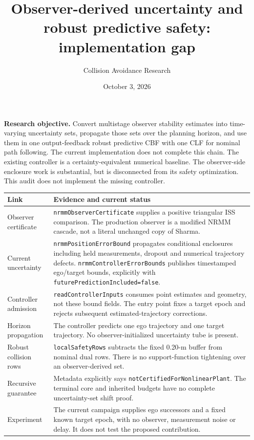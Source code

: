 \documentclass[10pt]{article}
\title{Observer-derived uncertainty and robust predictive safety: implementation gap}
\author{Collision Avoidance Research}
\date{October 3, 2026}
\begin{document}
\maketitle
\textbf{Research objective.} Convert multistage observer stability estimates into
time-varying uncertainty sets, propagate those sets over the planning horizon,
and use them in one output-feedback robust predictive CBF with one CLF for
nominal path following. The current implementation does not complete this chain.
The existing controller is a certainty-equivalent numerical baseline. The
observer-side enclosure work is substantial, but is disconnected from its safety
optimization. This audit does not implement the missing controller.

\begin{tabularx}{\textwidth}{@{}l>{\raggedright\arraybackslash}X@{}}
\toprule
Link & Evidence and current status \\
\midrule
Observer certificate & \texttt{nrmmObserverCertificate} supplies a positive triangular ISS comparison. The production observer is a modified NRMM cascade, not a literal unchanged copy of Sharma. \\
Current uncertainty & \texttt{nrmmPositionErrorBound} propagates conditional enclosures including held measurements, dropout and numerical trajectory defects. \texttt{nrmmControllerErrorBounds} publishes timestamped ego/target bounds, explicitly with \texttt{futurePredictionIncluded=false}. \\
Controller admission & \texttt{readControllerInputs} consumes point estimates and geometry, not these bound fields. The entry point fixes a target epoch and rejects subsequent estimated-trajectory corrections. \\
Horizon propagation & The controller predicts one ego trajectory and one target trajectory. No observer-initialized uncertainty tube is present. \\
Robust collision rows & \texttt{localSafetyRows} subtracts the fixed 0.20-m buffer from nominal dual rows. There is no support-function tightening over an observer-derived set. \\
Recursive guarantee & Metadata explicitly says \texttt{notCertifiedForNonlinearPlant}. The terminal core and inherited budgets have no complete uncertainty-set shift proof. \\
Experiment & The current campaign supplies ego successors and a fixed known target epoch, with no observer, measurement noise or delay. It does not test the proposed contribution. \\
\bottomrule
\end{tabularx}
\end{document}
